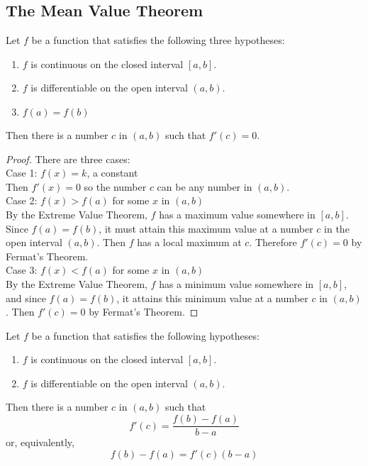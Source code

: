\subsection{The Mean Value Theorem}

\begin{theorem}
    Let \(f\) be a function that satisfies the following three hypotheses:
    \begin{enumerate}
        \item \(f\) is continuous on the closed interval \([a,b]\).
        \item \(f\) is differentiable on the open interval \((a,b)\).
        \item \(f(a)=f(b)\)
    \end{enumerate}
    Then there is a number \(c\) in \((a,b)\) such that \(f'(c)=0\).
\end{theorem}
\begin{proof}
    There are three cases: \\
    Case 1: \(f(x)=k\), a constant \\
    Then \(f'(x)=0\) so the number \(c\) can be any number in \((a,b)\). \\
    Case 2: \(f(x)>f(a)\) for some \(x\) in \((a,b)\) \\
    By the Extreme Value Theorem, \(f\) has a maximum value somewhere in
    \([a,b]\).
    Since \(f(a)=f(b)\), it must attain this maximum value at a number \(c\)
    in the open interval \((a,b)\).
    Then \(f\) has a local maximum at \(c\).
    Therefore \(f'(c)=0\) by Fermat's Theorem. \\
    Case 3: \(f(x)<f(a)\) for some \(x\) in \((a,b)\) \\
    By the Extreme Value Theorem, \(f\) has a minimum value somewhere in
    \([a,b]\), and since \(f(a)=f(b)\), it attains this minimum value at a
    number \(c\) in \((a,b)\).
    Then \(f'(c)=0\) by Fermat's Theorem.
\end{proof}
\begin{theorem}
    Let \(f\) be a function that satisfies the following hypotheses:
    \begin{enumerate}
        \item \(f\) is continuous on the closed interval \([a,b]\).
        \item \(f\) is differentiable on the open interval \((a,b)\).
    \end{enumerate}
    Then there is a number \(c\) in \((a,b)\) such that
    \[f'(c)=\frac{f(b)-f(a)}{b-a}\]
    or, equivalently,
    \[f(b)-f(a)=f'(c)(b-a)\]
\end{theorem}

